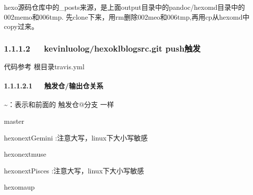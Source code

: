 \documentclass[letterpaper,12pt,english]{sphinxmanual}
\begin{document}
hexo源码仓库中的\_posts来源，是上面output目录中的pandoc/hexomd目录中的002memo和006tmp. 先clone下来，用rm删除002meo和006tmp,再用cp从hexomd中copy过来。


\subsubsection{1.1.1.2   kevinluolog/hexo\sphinxhyphen{}klblog\sphinxhyphen{}src.git push触发}
\label{\detokenize{001software/001install/001._u7f51_u7ad9/gitpage:kevinluolog-hexo-klblog-src-git-push}}
代码参考 根目录travis.yml


\paragraph{1.1.1.2.1   触发仓/输出仓关系}
\label{\detokenize{001software/001install/001._u7f51_u7ad9/gitpage:id3}}
\textasciitilde{}：表示和前面的 触发仓@分支 一样

\begin{DUlineblock}{0em}
\item[] master
\item[] hexo\sphinxhyphen{}next\sphinxhyphen{}Gemini :注意大写，linux下大小写敏感
\item[] hexo\sphinxhyphen{}next\sphinxhyphen{}muse
\item[] hexo\sphinxhyphen{}next\sphinxhyphen{}Pisces :注意大写，linux下大小写敏感
\item[] hexo\sphinxhyphen{}maup
\end{DUlineblock}
\end{document}
